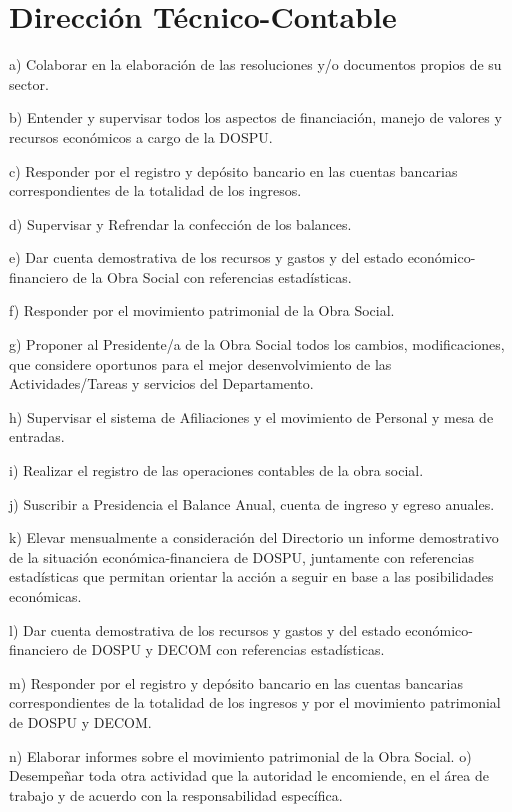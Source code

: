\section{Dirección Técnico-Contable}
\begin{displayquote}
a) Colaborar en la elaboración de las resoluciones y/o documentos propios de su sector.

b) Entender y supervisar todos los aspectos de financiación, manejo de valores y recursos económicos a cargo de la DOSPU.

c) Responder por el registro y depósito bancario en las cuentas bancarias correspondientes de la totalidad de los ingresos.

d) Supervisar y Refrendar la confección de los balances.

e) Dar cuenta demostrativa de los recursos y gastos y del estado económico-financiero de la Obra Social con referencias estadísticas.

f) Responder por el movimiento patrimonial de la Obra Social.

g) Proponer al Presidente/a de la Obra Social todos los cambios, modificaciones, que considere oportunos para el mejor desenvolvimiento de las Actividades/Tareas y servicios del Departamento.

h) Supervisar el sistema de Afiliaciones y el movimiento de Personal y mesa de entradas.

i) Realizar el registro de las operaciones contables de la obra social.

j) Suscribir a Presidencia el Balance Anual, cuenta de ingreso y egreso anuales.

k) Elevar mensualmente a consideración del Directorio un informe demostrativo de la situación económica-financiera de DOSPU, juntamente con referencias estadísticas que permitan orientar la acción a seguir en base a las posibilidades económicas.

l) Dar cuenta demostrativa de los recursos y gastos y del estado económico-financiero de DOSPU y DECOM con referencias estadísticas.

m) Responder por el registro y depósito bancario en las cuentas bancarias correspondientes de la totalidad de los ingresos y por el movimiento patrimonial de DOSPU y DECOM.

n) Elaborar informes sobre el movimiento patrimonial de la Obra Social. o) Desempeñar toda otra actividad que la autoridad le encomiende, en el área de trabajo y de acuerdo con la responsabilidad específica.
\hfill\parencite{CSOrd17}
\end{displayquote}

